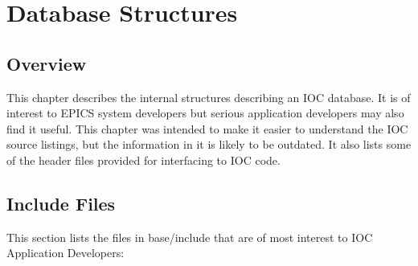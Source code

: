 \chapter{Database Structures}

\section{Overview}

This chapter describes the internal structures describing an IOC database.
It is of interest to EPICS system developers but serious application developers may also find it useful.
This chapter was intended to make it easier to understand the IOC source listings, but the information in it is likely to be outdated.
It also lists some of the header files provided for interfacing to IOC code.

\section{Include Files}

This section lists the files in base/include that are of most interest to IOC Application Developers:

